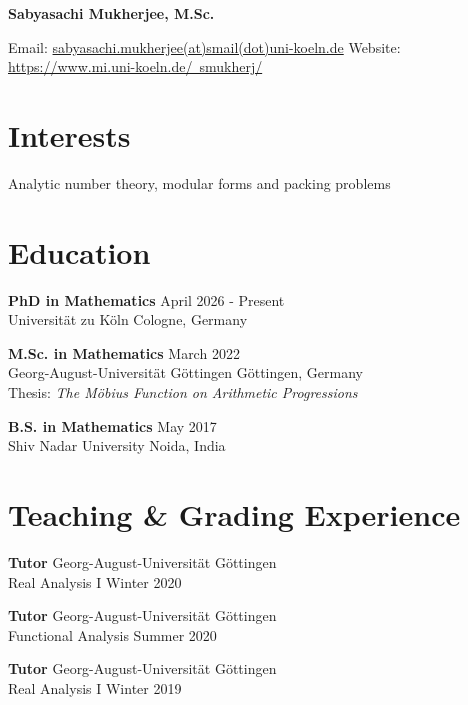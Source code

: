 \documentclass[11pt,letterpaper]{article}
\newcommand{\dateright}[1]{\hfill\textnormal{#1}}
\newcommand{\entry}[4]{%
    \textbf{#1} \dateright{#3}\\
    #2 \dateright{#4}
}
\begin{document}
{\LARGE\textbf{Sabyasachi Mukherjee, M.Sc.}}

\vspace{0.2cm}

Email: \href{mailto:sabyasachi.mukherjee@smail.uni-koeln.de}{sabyasachi.mukherjee(at)smail(dot)uni-koeln.de} \hspace{0.3cm} Website: \href{https://www.mi.uni-koeln.de/~smukherj/}{https://www.mi.uni-koeln.de/~smukherj/}




\section*{Interests}

Analytic number theory, modular forms and packing problems

\section*{Education}

\entry{PhD in Mathematics}{Universität zu Köln}{April 2026 - Present}{Cologne, Germany}

\entry{M.Sc. in Mathematics}{Georg-August-Universität Göttingen}{March 2022}{Göttingen, Germany}\\
Thesis: \textit{The Möbius Function on Arithmetic Progressions}

\vspace{0.2cm}

\entry{B.S. in Mathematics}{Shiv Nadar University}{May 2017}{Noida, India}


\vspace{0.2cm}


\section*{Teaching \& Grading Experience}

\entry{Tutor}{Real Analysis I}{Georg-August-Universität Göttingen}{Winter 2020}
\vspace{0.2cm}

\entry{Tutor}{Functional Analysis}{Georg-August-Universität Göttingen}{Summer 2020}

\vspace{0.2cm}

\entry{Tutor}{Real Analysis I }{Georg-August-Universität Göttingen}{Winter 2019}
\vspace{0.2cm}
\end{document}
